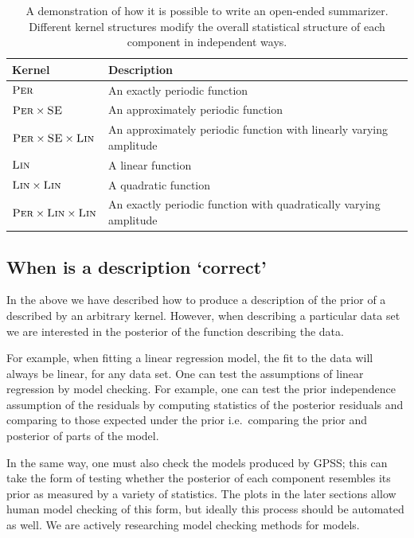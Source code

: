 \documentclass{article}
\def\ie{i.e.\ }
\begin{document}
\begin{table}[ht]
\begin{tabular}{l|l}
Kernel & Description \\
\midrule
${\textsc{Per}}$ & An exactly periodic function \\
${\textsc{Per}} \times {\textsc{SE}}$ & An approximately periodic function \\
${\textsc{Per}} \times {\textsc{SE}} \times {\textsc{Lin}}$ & An approximately periodic function with linearly varying amplitude \\
${\textsc{Lin}}$ & A linear function \\
${\textsc{Lin}} \times {\textsc{Lin}}$ & A quadratic function \\
${\textsc{Per}} \times {\textsc{Lin}} \times {\textsc{Lin}}$ & An exactly periodic function with quadratically varying amplitude\\
\end{tabular}
\caption{A demonstration of how it is possible to write an open-ended summarizer.  Different kernel structures modify the overall statistical structure of each component in independent ways.}
\label{table:descriptions}
\end{table}

\subsection{When is a description `correct'}

In the above we have described how to produce a description of the prior of a \gp{} described by an arbitrary kernel.
However, when describing a particular data set we are interested in the posterior of the function describing the data.

For example, when fitting a linear regression model, the fit to the data will always be linear, for any data set.
One can test the assumptions of linear regression by model checking.
For example, one can test the prior independence assumption of the residuals by computing statistics of the posterior residuals and comparing to those expected under the prior \ie comparing the prior and posterior of parts of the model.

In the same way, one must also check the models produced by GPSS; this can take the form of testing whether the posterior of each component resembles its prior as measured by a variety of statistics.
The plots in the later sections allow human model checking of this form, but ideally this process should be automated as well.
We are actively researching model checking methods for \gp{} models.
\end{document}
